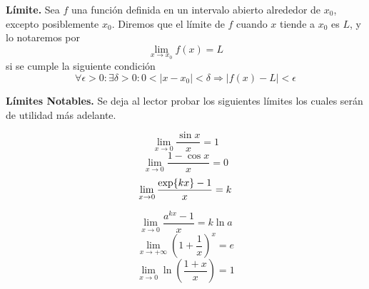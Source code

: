 \begin{definition}{\textbf{Límite.}}
    Sea $f$ una funci\'on  definida en un intervalo abierto alrededor de $x_0$, excepto posiblemente $x_0$.   Diremos que el l\'imite de $f$ cuando $x$ tiende a $x_0$ es $L$, y lo notaremos por 
   \begin{equation*}
        \lim_{x\to x_0}{f(x)}=L
    \end{equation*}  si se cumple la siguiente condici\'on
    \begin{equation*}
        \forall \epsilon>0 : \exists \delta >0 : 0<\left\lvert x-x_0 \right\rvert<\delta \Rightarrow \left\lvert f(x) - L\right\rvert < \epsilon 
    \end{equation*}
    \label{def:Limite}
\end{definition}

\begin{obs}{\textbf{Límites Notables.}}
    \label{obs:LimitesNotables}
   Se deja al lector probar los siguientes límites  los cuales ser\'an de utilidad m\'as adelante. 

    \begin{minipage}{0.45\textwidth}
        \begin{equation}
            \lim_{x\to 0}{\frac{\sin{x}}{x}}=1
            \label{limNot:sen(x)/x}
        \end{equation}
        \begin{equation}
            \lim_{x\to 0}{\frac{1-\cos{x}}{x}}=0
            \label{limNot:(1-cos(x))/x}
        \end{equation}
        \begin{equation}
            \lim_{x\to 0}{\frac{\exp{kx}-1}{x}}=k
            \label{limNot:(e^{kx}-1)/(x)}
        \end{equation}
    \end{minipage}
    \hfill
    \begin{minipage}{0.45\textwidth}
        \begin{equation}
            \lim_{x\to 0}{\frac{a^{kx}-1}{x}}=k\ln{a}
            \label{limNot:(a^(kx)-1)/(x)}
        \end{equation}
        \begin{equation}
            \lim_{x\to +\infty}{\left( 1+\frac{1}{x} \right)^x}=e
            \label{limNot:e}
        \end{equation}
        \begin{equation}
            \lim_{x\to 0}{\ln{\left(\frac{1+x}{x} \right)}}=1
            \label{limNot:ln(1+x/x)}
        \end{equation}
    \end{minipage}
\end{obs}

